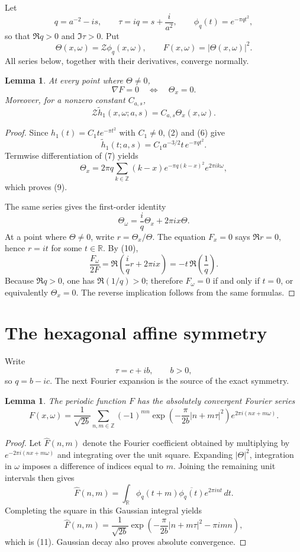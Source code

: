 \documentclass[11pt]{article}
\newtheorem{lemma}[theorem]{Lemma}
\newcommand{\cZ}{\mathcal Z}
\newcommand{\R}{\mathbb R}
\newcommand{\Z}{\mathbb Z}
\begin{document}
Let
\[
 q=a^{-2}-is,\qquad \tau=iq=s+\frac{i}{a^2},\qquad
 \phi_q(t)=e^{-\pi q t^2},
 \tag{6}
\]
so that \(\Re q>0\) and \(\Im\tau>0\).  Put
\[
 \Theta(x,\omega)=\cZ\phi_q(x,\omega),\qquad
 F(x,\omega)=|\Theta(x,\omega)|^2.
 \tag{7}
\]
All series below, together with their derivatives, converge normally.

\begin{lemma}\label{lem:critical}
At every point where \(\Theta\ne0\),
\[
 \nabla F=0\quad\Longleftrightarrow\quad \Theta_x=0.
 \tag{8}
\]
Moreover, for a nonzero constant \(C_{a,s}\),
\[
 \cZ\widetilde h_1(x,\omega;a,s)=C_{a,s}\Theta_x(x,\omega).
 \tag{9}
\]
\end{lemma}

\begin{proof}
Since \(h_1(t)=C_1t e^{-\pi t^2}\) with \(C_1\ne0\), (2) and (6) give
\[
 \widetilde h_1(t;a,s)=C_1a^{-3/2}t\,e^{-\pi q t^2}.
\]
Termwise differentiation of (7) yields
\[
 \Theta_x
 =2\pi q\sum_{k\in\Z}(k-x)e^{-\pi q(k-x)^2}e^{2\pi i k\omega},
\]
which proves (9).

The same series gives the first-order identity
\[
 \Theta_\omega=\frac{i}{q}\Theta_x+2\pi i x\Theta.
 \tag{10}
\]
At a point where \(\Theta\ne0\), write \(r=\Theta_x/\Theta\).  The equation
\(F_x=0\) says \(\Re r=0\), hence \(r=it\) for some \(t\in\R\).  By (10),
\[
 \frac{F_\omega}{2F}
 =\Re\!\left(\frac{i}{q}r+2\pi i x\right)
 =-t\,\Re\!\left(\frac1q\right).
\]
Because \(\Re q>0\), one has \(\Re(1/q)>0\); therefore \(F_\omega=0\) if
and only if \(t=0\), or equivalently \(\Theta_x=0\).  The reverse
implication follows from the same formulas.
\end{proof}

\section{The hexagonal affine symmetry}

Write
\[
 \tau=c+ib,\qquad b>0,
\]
so \(q=b-ic\).  The next Fourier expansion is the source of the exact
symmetry.

\begin{lemma}\label{lem:fourier}
The periodic function \(F\) has the absolutely convergent Fourier series
\[
 F(x,\omega)
 =\frac1{\sqrt{2b}}\sum_{n,m\in\Z}
 (-1)^{mn}
 \exp\!\left(-\frac{\pi}{2b}|n+m\tau|^2\right)
 e^{2\pi i(nx+m\omega)}.
 \tag{11}
\]
\end{lemma}

\begin{proof}
Let \(\widehat F(n,m)\) denote the Fourier coefficient obtained by
multiplying by \(e^{-2\pi i(nx+m\omega)}\) and integrating over the unit
square.  Expanding \(|\Theta|^2\), integration in \(\omega\) imposes a
difference of indices equal to \(m\).  Joining the remaining unit intervals
then gives
\[
 \widehat F(n,m)
 =\int_\R \phi_q(t+m)\overline{\phi_q(t)}e^{2\pi i nt}\,dt.
\]
Completing the square in this Gaussian integral yields
\[
 \widehat F(n,m)
 =\frac1{\sqrt{2b}}
 \exp\!\left(-\frac{\pi}{2b}|n+m\tau|^2-\pi i mn\right),
\]
which is (11).  Gaussian decay also proves absolute convergence.
\end{proof}
\end{document}
